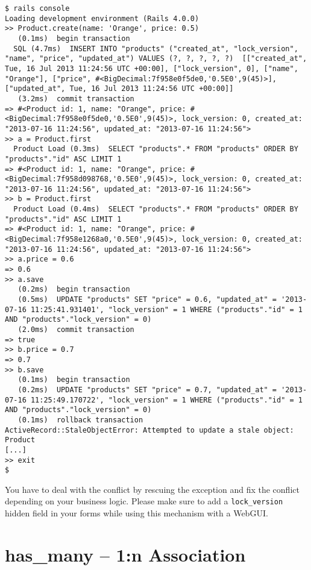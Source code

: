\documentclass[a4paper]{book}
\begin{document}
\begin{shaded}\begin{verbatim}
$ rails console
Loading development environment (Rails 4.0.0)
>> Product.create(name: 'Orange', price: 0.5)
   (0.1ms)  begin transaction
  SQL (4.7ms)  INSERT INTO "products" ("created_at", "lock_version", "name", "price", "updated_at") VALUES (?, ?, ?, ?, ?)  [["created_at", Tue, 16 Jul 2013 11:24:56 UTC +00:00], ["lock_version", 0], ["name", "Orange"], ["price", #<BigDecimal:7f958e0f5de0,'0.5E0',9(45)>], ["updated_at", Tue, 16 Jul 2013 11:24:56 UTC +00:00]]
   (3.2ms)  commit transaction
=> #<Product id: 1, name: "Orange", price: #<BigDecimal:7f958e0f5de0,'0.5E0',9(45)>, lock_version: 0, created_at: "2013-07-16 11:24:56", updated_at: "2013-07-16 11:24:56">
>> a = Product.first
  Product Load (0.3ms)  SELECT "products".* FROM "products" ORDER BY "products"."id" ASC LIMIT 1
=> #<Product id: 1, name: "Orange", price: #<BigDecimal:7f958d098768,'0.5E0',9(45)>, lock_version: 0, created_at: "2013-07-16 11:24:56", updated_at: "2013-07-16 11:24:56">
>> b = Product.first
  Product Load (0.4ms)  SELECT "products".* FROM "products" ORDER BY "products"."id" ASC LIMIT 1
=> #<Product id: 1, name: "Orange", price: #<BigDecimal:7f958e1268a0,'0.5E0',9(45)>, lock_version: 0, created_at: "2013-07-16 11:24:56", updated_at: "2013-07-16 11:24:56">
>> a.price = 0.6
=> 0.6
>> a.save
   (0.2ms)  begin transaction
   (0.5ms)  UPDATE "products" SET "price" = 0.6, "updated_at" = '2013-07-16 11:25:41.931401', "lock_version" = 1 WHERE ("products"."id" = 1 AND "products"."lock_version" = 0)
   (2.0ms)  commit transaction
=> true
>> b.price = 0.7
=> 0.7
>> b.save
   (0.1ms)  begin transaction
   (0.2ms)  UPDATE "products" SET "price" = 0.7, "updated_at" = '2013-07-16 11:25:49.170722', "lock_version" = 1 WHERE ("products"."id" = 1 AND "products"."lock_version" = 0)
   (0.1ms)  rollback transaction
ActiveRecord::StaleObjectError: Attempted to update a stale object: Product
[...]
>> exit
$
\end{verbatim}\end{shaded}

You have to deal with the conflict by rescuing the exception and fix the conflict depending on your business logic. Please make sure to add a \texttt{lock\_version} hidden field in your forms while using this mechanism with a WebGUI.

\section{has\_many -- 1:n Association}\label{hasux5fmany-1n-association}
\end{document}

